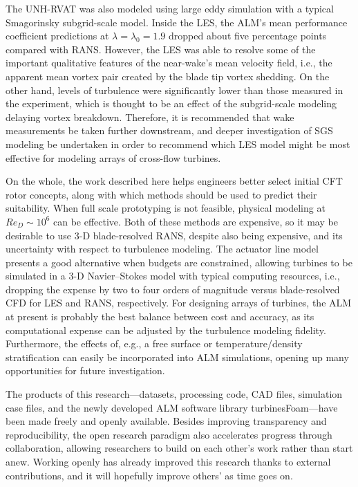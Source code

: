 The UNH-RVAT was also modeled using large eddy simulation with a typical
Smagorinsky subgrid-scale model. Inside the LES, the ALM's mean performance
coefficient predictions at $\lambda=\lambda_0=1.9$ dropped about five percentage
points compared with RANS. However, the LES was able to resolve some of the
important qualitative features of the near-wake's mean velocity field, i.e., the
apparent mean vortex pair created by the blade tip vortex shedding. On the other
hand, levels of turbulence were significantly lower than those measured in the
experiment, which is thought to be an effect of the subgrid-scale modeling
delaying vortex breakdown. Therefore, it is recommended that wake measurements
be taken further downstream, and deeper investigation of SGS modeling be
undertaken in order to recommend which LES model might be most effective for
modeling arrays of cross-flow turbines.

On the whole, the work described here helps engineers better select initial CFT
rotor concepts, along with which methods should be used to predict their
suitability. When full scale prototyping is not feasible, physical modeling at
$Re_D \sim 10^6$ can be effective. Both of these methods are expensive, so it
may be desirable to use 3-D blade-resolved RANS, despite also being expensive,
and its uncertainty with respect to turbulence modeling. The actuator line model
presents a good alternative when budgets are constrained, allowing turbines to
be simulated in a 3-D Navier--Stokes model with typical computing resources,
i.e., dropping the expense by two to four orders of magnitude versus
blade-resolved CFD for LES and RANS, respectively. For designing arrays of
turbines, the ALM at present is probably the best balance between cost and
accuracy, as its computational expense can be adjusted by the turbulence
modeling fidelity. Furthermore, the effects of, e.g., a free surface or
temperature/density stratification can easily be incorporated into ALM
simulations, opening up many opportunities for future investigation.

The products of this research---datasets, processing code, CAD files, simulation
case files, and the newly developed ALM software library turbinesFoam---have
been made freely and openly available. Besides improving transparency and
reproducibility, the open research paradigm also accelerates progress through
collaboration, allowing researchers to build on each other's work rather than
start anew. Working openly has already improved this research thanks to external
contributions, and it will hopefully improve others' as time goes on.
